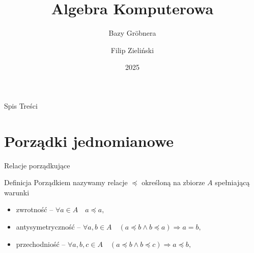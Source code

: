 \documentclass{beamer}
\title{Algebra Komputerowa}
\subtitle{Bazy Gr{\"o}bnera \cite{ComputerAlgebra,LCM,Computative1,Dumnicki}}
\author{Filip Zieli\'nski}
\date{2025}
\begin{document}
\begin{frame}
    \titlepage
\end{frame}
 
\begin{frame}{Spis Treści}
    \tableofcontents
\end{frame}

\section{Porządki jednomianowe}
\begin{frame}{Relacje porządkujące}
    \begin{block}{Definicja}
        Porządkiem  nazywamy relacje $\preceq$ określoną na zbiorze $A$ spełniającą warunki
        \begin{itemize}
            \item \alert{zwrotność} -- $\forall a \in A \quad a \preceq a,$
            \item \alert{antysymetryczność} -- $\forall a,b \in A \quad (a \preceq b \land b \preceq a) \Rightarrow  a = b,$
            \item \alert{przechodniość} -- $\forall a,b,c \in A \quad  (a \preceq b \land b \preceq c) \Rightarrow a \preceq b,$
        \end{itemize}
    \end{block}
\end{frame}
\end{document}
